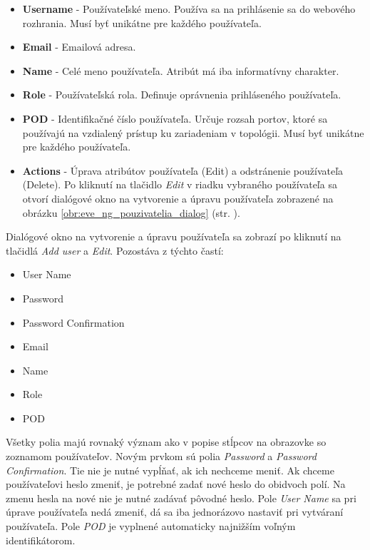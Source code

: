 \begin{itemize}[noitemsep]
    \item \textbf{Username} - Používateľské meno. Používa sa na prihlásenie sa do webového rozhrania. Musí byť unikátne pre každého používateľa.
    \item \textbf{Email} - Emailová adresa.
    \item \textbf{Name} - Celé meno používateľa. Atribút má iba informatívny charakter.
    \item \textbf{Role} - Používateľská rola. Definuje oprávnenia prihláseného používateľa.
    \item \textbf{POD} - Identifikačné číslo používateľa. Určuje rozsah portov, ktoré sa používajú na vzdialený prístup ku zariadeniam v topológii. Musí byť unikátne pre každého používateľa.
    \item \textbf{Actions} - Úprava atribútov používateľa (Edit) a odstránenie používateľa (Delete). Po kliknutí na tlačidlo \emph{Edit} v riadku vybraného používateľa sa otvorí dialógové okno na vytvorenie a úpravu používateľa zobrazené na obrázku \ref{obr:eve_ng_pouzivatelia_dialog} (str. \pageref{obr:eve_ng_pouzivatelia_dialog}).
\end{itemize}

Dialógové okno na vytvorenie a úpravu používateľa sa zobrazí po kliknutí na tlačidlá \emph{Add user} a \emph{Edit}. Pozostáva z týchto častí:

\begin{itemize}[noitemsep]
    \item User Name
    \item Password
    \item Password Confirmation
    \item Email
    \item Name
    \item Role
    \item POD
\end{itemize}

Všetky polia majú rovnaký význam ako v popise stĺpcov na obrazovke so zoznamom používateľov. Novým prvkom sú polia \emph{Password} a \emph{Password Confirmation}. Tie nie je nutné vypĺňať, ak ich nechceme meniť. Ak chceme používateľovi heslo zmeniť, je potrebné zadať nové heslo do obidvoch polí. Na zmenu hesla na nové nie je nutné zadávať pôvodné heslo. Pole \emph{User Name} sa pri úprave používateľa nedá zmeniť, dá sa iba jednorázovo nastaviť pri vytváraní používateľa. Pole \emph{POD} je vyplnené automaticky najnižším voľným identifikátorom.

